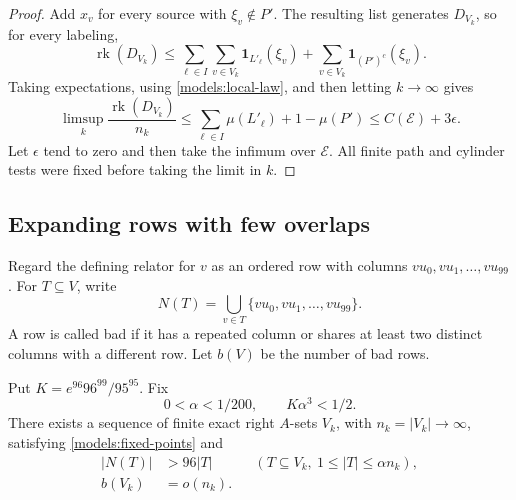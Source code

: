 \begin{proof}
Add $x_v$ for every source with $\xi_v\notin P'$. The resulting list
generates $D_{V_k}$, so for every labeling,
\[
 \operatorname{rk}(D_{V_k})\le
 \sum_{\ell\in I}\sum_{v\in V_k}\mathbf1_{L'_\ell}(\xi_v)
 +\sum_{v\in V_k}\mathbf1_{(P')^c}(\xi_v).
\]
Taking expectations, using \eqref{models:local-law}, and then letting
$k\to\infty$ gives
\[
 \limsup_k\frac{\operatorname{rk}(D_{V_k})}{n_k}
 \le\sum_{\ell\in I}\mu(L'_\ell)+1-\mu(P')
 \le C(\mathcal E)+3\epsilon.
\]
Let $\epsilon$ tend to zero and then take the infimum over
$\mathcal E$. All finite path and cylinder tests were fixed before
taking the limit in $k$.
\end{proof}

\subsection{Expanding rows with few overlaps}

Regard the defining relator for $v$ as an ordered row with columns
$vu_0,vu_1,\ldots,vu_{99}$. For $T\subseteq V$, write
\[
 N(T)=\bigcup_{v\in T}\{vu_0,vu_1,\ldots,vu_{99}\}.
\]
A row is called bad if it has a repeated column or shares at least
two distinct columns with a different row. Let $b(V)$ be the number
of bad rows.

\begin{proposition}\label{models:sequence}
Put $K=e^{96}96^{99}/95^{95}$. Fix
\[
 0<\alpha<1/200,\qquad K\alpha^3<1/2.
\]
There exists a sequence of finite exact right $A$-sets $V_k$, with
$n_k=|V_k|\to\infty$, satisfying \eqref{models:fixed-points} and
\begin{align}
 |N(T)|&>96|T|
 &&(T\subseteq V_k,\ 1\le |T|\le\alpha n_k),
 \label{models:expansion}\\
 b(V_k)&=o(n_k).
 \label{models:bad-rows}
\end{align}
\end{proposition}

